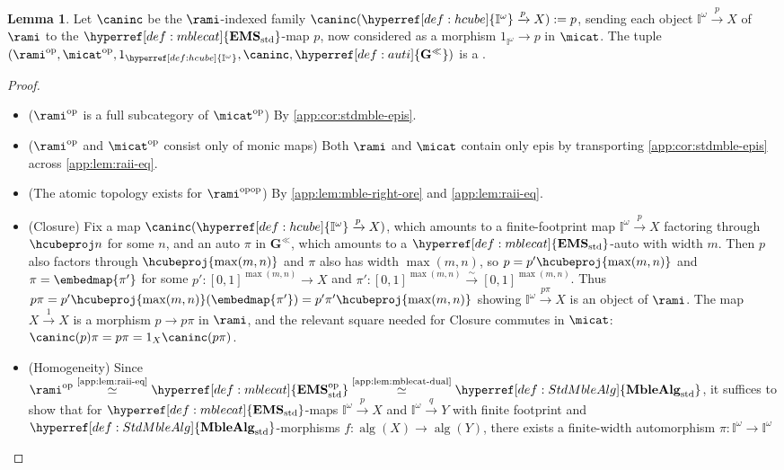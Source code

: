 \documentclass[
  sigconf,
  screen, ]{acmart}
\theoremstyle{definition}
\newtheorem{lemma}[theorem]{Lemma}
\newcommand\nref[2]{\hyperref[#1]{#2}} \newcommand\checkhigh{{\huge{\color{red}\textbf{TODO: check}}}}
\newcommand\op{^{\rm op}}
\newcommand\measalg{\operatorname{\nref{app:cons:measalg}{alg}}}
\newcommand\texhcube{{{{\mathbb I}^\omega}}}
\newcommand\hcube{{\nref{def:hcube}{\texhcube}}}
\newcommand\texStdMble{\mathbf{EMS}_{\rm std}}
\newcommand\StdMble{{\nref{def:mblecat}{\texStdMble}}}
\newcommand\StdMbleop{{\nref{def:mblecat}{\texStdMble\op}}}
\newcommand\StdMbleAlg{{\nref{def:StdMbleAlg}{\mathbf{MbleAlg}_{\rm std}}}}
\newcommand\texauti{\mathbf{G}^{\ll}}
\newcommand\auti{{\nref{def:auti}{\texauti}}}
\begin{document}
\begin{lemma} \label{app:lem:mble-nominal-situation}
  Let $\caninc$ be the $\rami$-indexed family
  $\caninc(\hcube\xrightarrow p X) := p$,
  sending each object $\hcube\xrightarrow pX$ of $\rami$
  to the $\StdMble$-map $p$, now considered as a
  morphism $1_{\hcube}\to p$ in $\micat$.
  The tuple $(\rami\op,\micat\op,1_{\hcube},\caninc,\auti)$
  is a .
\end{lemma}
\begin{proof}
  ~\begin{itemize}
    \item ($\rami\op$ is a full subcategory of $\micat\op$)
      By \cref{app:cor:stdmble-epis}.
    \item ($\rami\op$ and $\micat\op$ consist only of monic maps)
      Both $\rami$ and $\micat$ contain only epis by transporting \cref{app:cor:stdmble-epis}
      across \cref{app:lem:raii-eq}.
    \item (The atomic topology exists for $\rami^{\rm op op}$)
      By \cref{app:lem:mble-right-ore} and \cref{app:lem:raii-eq}.
    \item (Closure)
      Fix a map $\caninc(\hcube\xrightarrow p X)$,
      which amounts to a finite-footprint map
      $\hcube\xrightarrow p X$ factoring through $\hcubeproj n$
      for some $n$,
      and an auto $\pi$ in $\auti$,
      which amounts to a $\StdMble$-auto
      with width $m$.
      Then $p$ also factors through $\hcubeproj{\max(m,n)}$
      and $\pi$ also has width $\max(m,n)$,
      so $p = p'\hcubeproj{\max(m,n)}$
      and $\pi = \embedmap{\pi'}$
      for some $p' : [0,1]^{\max(m,n)}\to X$
      and $\pi' : [0,1]^{\max(m,n)}\xrightarrow\sim[0,1]^{\max(m,n)}$.
      Thus $p \pi = p'\hcubeproj{\max(m,n)}(\embedmap{\pi'})
      = p'\pi' \hcubeproj{\max(m,n)}$
      showing $\hcube\xrightarrow{p\pi} X$
      is an object of $\rami$.
      The map $X\xrightarrow 1 X$
      is a morphism $p\to p\pi$ in $\rami$,
      and the relevant square needed for Closure commutes in $\micat$:
      $\caninc(p)\pi = p\pi = 1_X\caninc(p\pi)$.
    \item (Homogeneity)
      Since $\rami\op\stackrel{\text{\cref{app:lem:raii-eq}}}\simeq\StdMbleop
      \stackrel{\text{\cref{app:lem:mblecat-dual}}}\simeq\StdMbleAlg$,
      it suffices to show that for $\StdMble$-maps
      $\hcube\xrightarrow pX$
      and $\hcube\xrightarrow qY$
      with finite footprint
      and $\StdMbleAlg$-morphisms
      $f : \measalg(X)\to\measalg(Y)$,
      there exists a finite-width automorphism $\pi :\hcube\to\hcube$

\end{itemize}
\end{proof}
\end{document}
